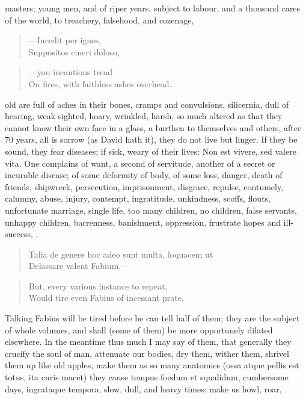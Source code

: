 {masters; young men, and of riper years, subject to labour, and a
thousand cares of the world, to treachery, falsehood, and cozenage,
%
\begin{verse}
---\textlatin{Incedit per ignes},\\
\textlatin{Suppositos cineri doloso},
\end{verse}
\translationrule
\begin{verse}
---you incautious tread\\
On fires, with faithless ashes overhead.
\end{verse}
%
old are full of aches in their bones, cramps and convulsions,
silicernia, dull of hearing, weak sighted, hoary, wrinkled, harsh, so
much altered as that they cannot know their own face in a glass, a
burthen to themselves and others, after 70 years, all is sorrow (as
David hath it), they do not live but linger. If they be sound, they
fear diseases; if sick, weary of their lives: Non est vivere, sed
valere vita. One complains of want, a second of servitude,
another of a secret or incurable disease; of some deformity of
body, of some loss, danger, death of friends, shipwreck, persecution,
imprisonment, disgrace, repulse,  contumely, calumny, abuse,
injury, contempt, ingratitude, unkindness, scoffs, flouts, unfortunate
marriage, single life, too many children, no children, false servants,
unhappy children, barrenness, banishment, oppression, frustrate hopes
and ill-success, \etc{}.
%
\begin{verse}
\textlatin{Talia de genere hoc adeo sunt multa, loquacem ut}\\
\textlatin{Delassare valent Fabium}.---
\end{verse}
\translationrule
\begin{verse}
But, every various instance to repeat,\\
Would tire even Fabius of incessant prate.
\end{verse}
%
Talking Fabius will be tired before he can tell half of them; they are
the subject of whole volumes, and shall (some of them) be more
opportunely dilated elsewhere. In the meantime thus much I may say of
them, that generally they crucify the soul of man, attenuate our
bodies, dry them, wither them, shrivel them up like old apples, make
them as so many anatomies (ossa atque pellis est totus, ita curis
macet) they cause tempus foedum et squalidum, cumbersome days,
ingrataque tempora, slow, dull, and heavy times: make us howl, roar,
}
